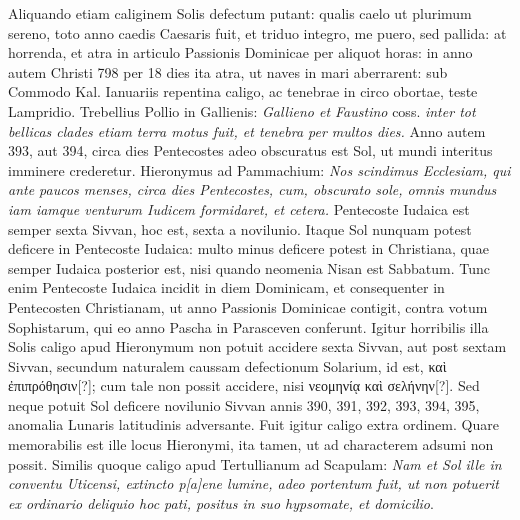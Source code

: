 Aliquando etiam caliginem Solis defectum putant:
 qualis caelo ut plurimum
sereno, toto anno caedis Caesaris fuit, et triduo integro, me puero,
sed pallida: at horrenda, et atra in articulo Passionis Dominicae
per aliquot horas: in anno autem Christi 798 per 18 dies ita atra, ut
naves in mari aberrarent: sub Commodo Kal. Ianuariis repentina caligo,
ac tenebrae in circo obortae, teste Lampridio.
Trebellius Pollio in
Gallienis: \textit{Gallieno et Faustino}
 coss. \textit{inter tot bellicas clades etiam terra
motus fuit, et tenebra per multos dies.}
Anno autem 393, aut 394, circa
dies Pentecostes adeo obscuratus est Sol, ut mundi interitus imminere
crederetur.
Hieronymus ad Pammachium: \textit{Nos scindimus Ecclesiam,
qui ante paucos menses, circa dies Pentecostes, cum, obscurato
sole, omnis mundus iam iamque venturum Iudicem formidaret, et cetera.}
Pentecoste Iudaica est semper sexta Sivvan, hoc est, sexta a novilunio.
Itaque Sol nunquam potest deficere in Pentecoste Iudaica: multo minus
deficere potest in Christiana, quae semper Iudaica posterior est, nisi
quando neomenia Nisan est Sabbatum.
Tunc enim Pentecoste Iudaica
incidit in diem Dominicam, et consequenter in Pentecosten Christianam,
ut anno Passionis Dominicae contigit, contra votum Sophistarum,
qui eo anno Pascha in Parasceven conferunt.
Igitur horribilis
illa Solis caligo apud Hieronymum non potuit accidere sexta Sivvan,
aut post sextam Sivvan, secundum naturalem caussam defectionum
Solarium, id est, \textgreek{καὶ ἐπιπρόθησιν[?]}; cum tale non possit
accidere, nisi \textgreek{νεομηνίᾳ καὶ σελήνην[?]}.
Sed neque potuit Sol deficere novilunio
Sivvan annis 390, 391, 392, 393, 394, 395, anomalia Lunaris latitudinis
adversante.
Fuit igitur caligo extra ordinem.
Quare memorabilis
est ille locus Hieronymi, ita tamen, ut ad characterem adsumi non
possit.
Similis quoque caligo apud Tertullianum ad Scapulam: \textit{Nam et
Sol ille in conventu Uticensi, extincto p[a]ene lumine, adeo portentum fuit, ut
non potuerit ex ordinario deliquio hoc pati, positus in suo hypsomate, et
domicilio}.

